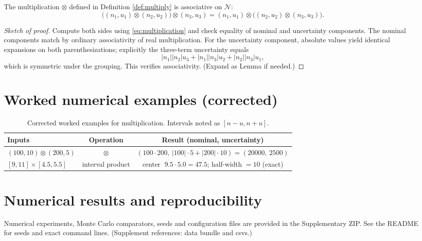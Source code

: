 \documentclass[11pt]{amsart}
\begin{document}
\begin{theorem}\label{thm:associative}
The multiplication $\otimes$ defined in Definition \ref{def:multiply} is associative on $\mathcal{N}$:
\begin{equation*}
\big((n_1,u_1)\otimes(n_2,u_2)\big)\otimes(n_3,u_3)
= (n_1,u_1)\otimes\big((n_2,u_2)\otimes(n_3,u_3)\big).
\end{equation*}
\end{theorem}
\begin{proof}[Sketch of proof]
Compute both sides using \eqref{eq:multiplication} and check equality of nominal and uncertainty components. The nominal components match by ordinary associativity of real multiplication. For the uncertainty component, absolute values yield identical expansions on both parenthesizations; explicitly the three-term uncertainty equals
\begin{equation*}
|n_1||n_2|u_3 + |n_1||n_3|u_2 + |n_2||n_3|u_1,
\end{equation*}
which is symmetric under the grouping. This verifies associativity. (Expand as Lemma if needed.)
\end{proof}

\section{Worked numerical examples (corrected)}
\begin{table}[h]
\centering
\caption{Corrected worked examples for multiplication. Intervals noted as $[n-u,n+u]$.}
\begin{tabular}{lcc}
\toprule
Inputs & Operation & Result (nominal, uncertainty) \\
\midrule
$(100,10)\otimes(200,5)$ & $\otimes$ & $(100\cdot200,\ |100|\cdot5 + |200|\cdot10) = (20000,\ 2500)$ \\
$[9,11]\times[4.5,5.5]$ & interval product & center $\;9.5\cdot5.0=47.5$; half-width $=10$ (exact)\\
\bottomrule
\end{tabular}
\end{table}

\section{Numerical results and reproducibility}
Numerical experiments, Monte Carlo comparators, seeds and configuration files are provided in the Supplementary ZIP. See the README for seeds and exact command lines. (Supplement references: data bundle and csvs.)
\end{document}
